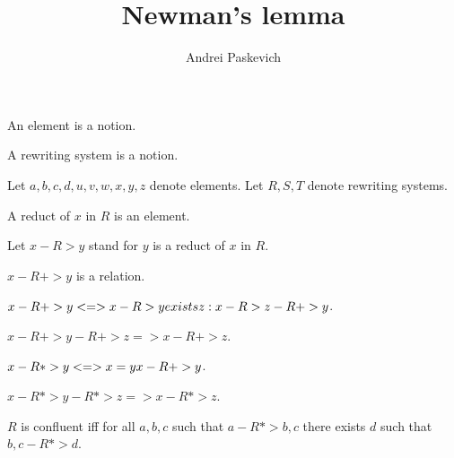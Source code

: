 \documentclass{article}
\title{Newman's lemma}
\author{Andrei Paskevich}
\date{}
\begin{document}

  \maketitle

  \begin{forthel}

    \begin{signature}[ElmSort]
      An element is a notion.
    \end{signature}

    \begin{signature}[RelSort]
      A rewriting system is a notion.
    \end{signature}

    Let $a,b,c,d,u,v,w,x,y,z$ denote elements. Let $R,S,T$ denote rewriting systems.

    \begin{signature}[Reduct]
      A reduct of $x$ in $R$ is an element.
    \end{signature}

    Let $x -R> y$ stand for $y$ is a reduct of $x$ in $R$.

    \begin{signature}
      $x -R+> y$ is a relation.
    \end{signature}

    \begin{axiom}[TCDef]
      $x -R+> y <=> x -R> y \/ exists z : x -R> z -R+> y$.
    \end{axiom}

    \begin{axiom}[TCTrans]
      $x -R+> y -R+> z => x -R+> z$.
    \end{axiom}

    \begin{definition}[TCRDef]
      $x -R*> y <=> x = y \/ x -R+> y$.
    \end{definition}

    \begin{lemma}[TCRTrans]
      $x -R*> y -R*> z => x -R*> z$.
    \end{lemma}

    \begin{definition}[CRDef]
      $R$ is confluent iff for all $a,b,c$ such that $a -R*> b,c$ there exists $d$ such that $b,c -R*> d$.
    \end{definition}


\end{forthel}
\end{document}
